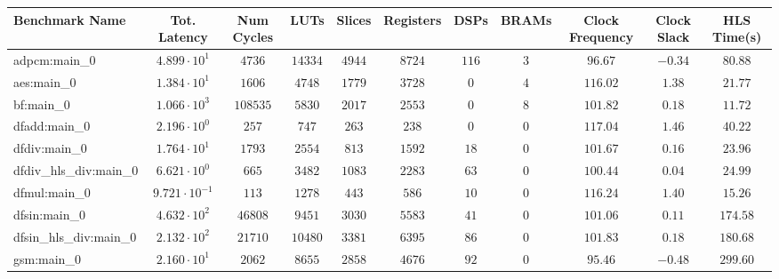 \begin{tabular}{|l|c|c|c|c|c|c|c|c|c|c|}
\hline
Benchmark Name          & Tot. Latency            & Num Cycles & LUTs      & Slices    & Registers & DSPs    & BRAMs  & Clock Frequency & Clock Slack & HLS Time(s) \\
\hline
adpcm:main\_0           & $ 4.899 \cdot 10^{1}  $ & $ 4736   $ & $ 14334 $ & $ 4944  $ & $ 8724  $ & $ 116 $ & $ 3  $ & $ 96.67       $ & $ -0.34   $ & $ 80.88   $ \\
aes:main\_0             & $ 1.384 \cdot 10^{1}  $ & $ 1606   $ & $ 4748  $ & $ 1779  $ & $ 3728  $ & $ 0   $ & $ 4  $ & $ 116.02      $ & $ 1.38    $ & $ 21.77   $ \\
bf:main\_0              & $ 1.066 \cdot 10^{3}  $ & $ 108535 $ & $ 5830  $ & $ 2017  $ & $ 2553  $ & $ 0   $ & $ 8  $ & $ 101.82      $ & $ 0.18    $ & $ 11.72   $ \\
dfadd:main\_0           & $ 2.196 \cdot 10^{0}  $ & $ 257    $ & $ 747   $ & $ 263   $ & $ 238   $ & $ 0   $ & $ 0  $ & $ 117.04      $ & $ 1.46    $ & $ 40.22   $ \\
dfdiv:main\_0           & $ 1.764 \cdot 10^{1}  $ & $ 1793   $ & $ 2554  $ & $ 813   $ & $ 1592  $ & $ 18  $ & $ 0  $ & $ 101.67      $ & $ 0.16    $ & $ 23.96   $ \\
dfdiv\_hls\_div:main\_0 & $ 6.621 \cdot 10^{0}  $ & $ 665    $ & $ 3482  $ & $ 1083  $ & $ 2283  $ & $ 63  $ & $ 0  $ & $ 100.44      $ & $ 0.04    $ & $ 24.99   $ \\
dfmul:main\_0           & $ 9.721 \cdot 10^{-1} $ & $ 113    $ & $ 1278  $ & $ 443   $ & $ 586   $ & $ 10  $ & $ 0  $ & $ 116.24      $ & $ 1.40    $ & $ 15.26   $ \\
dfsin:main\_0           & $ 4.632 \cdot 10^{2}  $ & $ 46808  $ & $ 9451  $ & $ 3030  $ & $ 5583  $ & $ 41  $ & $ 0  $ & $ 101.06      $ & $ 0.11    $ & $ 174.58  $ \\
dfsin\_hls\_div:main\_0 & $ 2.132 \cdot 10^{2}  $ & $ 21710  $ & $ 10480 $ & $ 3381  $ & $ 6395  $ & $ 86  $ & $ 0  $ & $ 101.83      $ & $ 0.18    $ & $ 180.68  $ \\
gsm:main\_0             & $ 2.160 \cdot 10^{1}  $ & $ 2062   $ & $ 8655  $ & $ 2858  $ & $ 4676  $ & $ 92  $ & $ 0  $ & $ 95.46       $ & $ -0.48   $ & $ 299.60  $ \\

\end{tabular}
